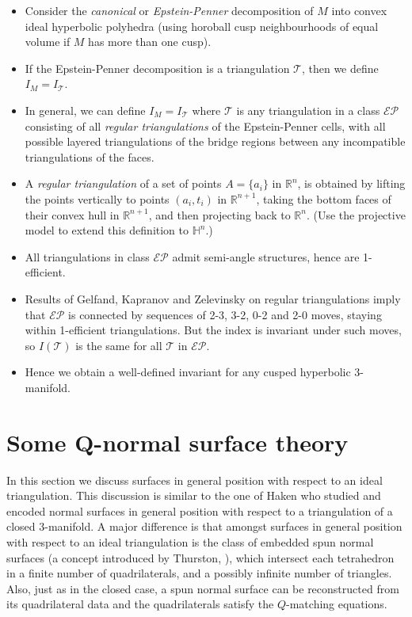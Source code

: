 \documentclass[12pt,reqno]{amsart}  %
\theoremstyle{definition}
\theoremstyle{remark}
\def\H{\mathbb{H}}
\def\R{\mathbb{R}}
\def\tri{\mathcal{T}}
\begin{document}
\begin{itemize}
\item 
Consider the {\em canonical} or {\em Epstein-Penner} decomposition of $M$ 
into convex ideal hyperbolic polyhedra (using horoball cusp neighbourhoods 
of equal volume if $M$ has more than one cusp).
\item 
If the Epstein-Penner decomposition is a triangulation $\tri$,
then we define $I_M=I_\tri$.
\item 
In general, we can define $I_M=I_\tri$ where $\tri$ is any triangulation
in a class $\mathcal{EP}$ consisting of all \emph{regular triangulations} 
of the Epstein-Penner cells, with all possible layered triangulations of 
the bridge regions between any incompatible triangulations of the faces.
\item 
A \emph{regular triangulation} of a set of points $A= \{ a_i \}$ in $\R^n$, 
is obtained by lifting the points vertically to points $(a_i,t_i)$ in 
$\R^{n+1}$, taking the bottom faces of their convex hull in $\R^{n+1}$, and 
then projecting back to $\R^n$. (Use the projective model to extend 
this definition to $\H^n$.)
\item 
All triangulations in class $\mathcal{EP}$ admit semi-angle structures,
hence are 1-efficient.
\item 
Results of Gelfand, Kapranov and Zelevinsky on {regular triangulations} 
imply that $\mathcal{EP}$ is connected by sequences of 2-3, 3-2, 0-2 and 
2-0 moves, staying within 1-efficient triangulations. But the index is 
invariant under such moves, so $I(\tri)$ is the same for all $\tri$ in 
$\mathcal{EP}$.
\item 
Hence we obtain a well-defined invariant for any cusped hyperbolic 3-manifold.
\end{itemize}


\section{Some Q-normal surface theory} 

 
In this section we discuss surfaces in general position with respect to
an ideal triangulation. This discussion is similar to the one of Haken
who studied and encoded normal surfaces in general position with respect
to a triangulation of a closed 3-manifold. A major difference is that amongst surfaces 
in general position with respect to an ideal triangulation is the class of embedded
spun normal surfaces (a concept introduced by Thurston, \cite{Th,Wa}), 
which intersect each tetrahedron 
in a finite number of quadrilaterals, and a possibly infinite number of triangles.
Also, just as in the closed case, a spun normal surface can be reconstructed from its quadrilateral data and the quadrilaterals satisfy the $Q$-matching equations.
\end{document}
